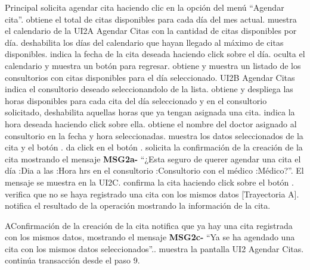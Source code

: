 \begin{UCtrayectoria}{Principal}
  \UCpaso[\UCactor] solicita agendar cita haciendo clic en la opción del menú “Agendar cita”.
  \UCpaso obtiene el total de citas disponibles para cada día del mes actual.
  \UCpaso muestra el calendario de la UI2A Agendar Citas con la cantidad de citas disponibles por día.
  \UCpaso deshabilita los días del calendario que hayan llegado al máximo de citas disponibles.
  \UCpaso[\UCactor] indica la fecha de la cita deseada haciendo click sobre el día.
  \UCpaso oculta el calendario y muestra un botón para regresar.
  \UCpaso obtiene y muestra un listado de los consultorios con citas disponibles para el día seleccionado. UI2B Agendar Citas
  \UCpaso[\UCactor] indica el consultorio deseado seleccionandolo de la lista.
  \UCpaso obtiene y despliega las horas disponibles para cada cita del día seleccionado y en el consultorio solicitado, 
  \UCpaso deshabilita aquellas horas que ya tengan asignada una cita.
  \UCpaso[\UCactor] indica la hora deseada haciendo click sobre ella.
  \UCpaso obtiene el nombre del doctor asignado al consultorio en la fecha y hora seleccionadas.
  \UCpaso muestra los datos seleccionados de la cita y el botón .
  \UCpaso[\UCactor] da click en el botón .
  \UCpaso solicita la confirmación de la creación de la cita mostrando el mensaje {\bf MSG2a-} “¿Esta seguro de querer agendar una cita el día :Dia a las :Hora hrs en el consultorio :Consultorio con el médico :Médico?”. El mensaje se muestra en la UI2C.
  \UCpaso[\UCactor] confirma la cita haciendo click sobre el botón .
  \UCpaso verifica que no se haya registrado una cita con los mismos datos [Trayectoria A].
  \UCpaso notifica el resultado de la operación mostrando la información de la cita.
\end{UCtrayectoria}

\begin{UCtrayectoriaA}{A}{Confirmación de la creación de la cita}
  \UCpaso notifica que ya hay una cita registrada con los mismos datos, mostrando el mensaje {\bf MSG2c-} “Ya se ha agendado una cita con los mismos datos seleccionados”..
  \UCpaso muestra la pantalla UI2 Agendar Citas.
  \UCpaso continúa transacción desde el paso 9.
\end{UCtrayectoriaA}

